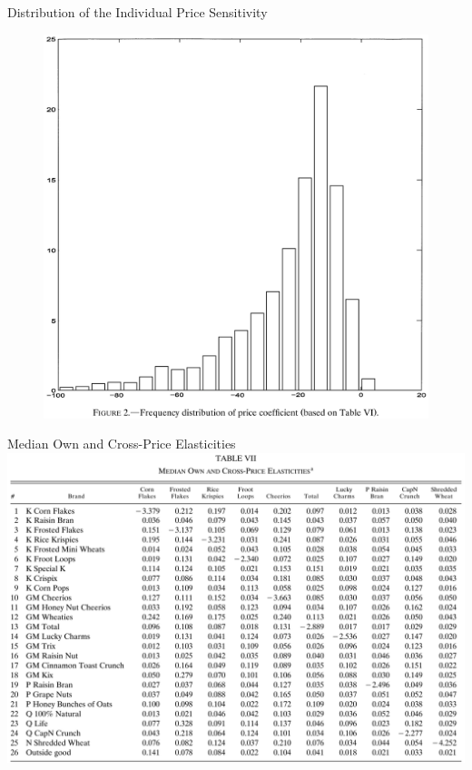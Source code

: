 \documentclass{beamer}
\begin{document}
\begin{frame}{Distribution of the Individual Price Sensitivity}
	\begin{figure}[h]
		\centering
		\includegraphics[scale=0.21]{figure2.png}
	\end{figure}
\end{frame}
\begin{frame}{Median Own and Cross-Price Elasticities}
	\centering
	\includegraphics[scale=0.22]{table7.png}
\end{frame}
\end{document}

